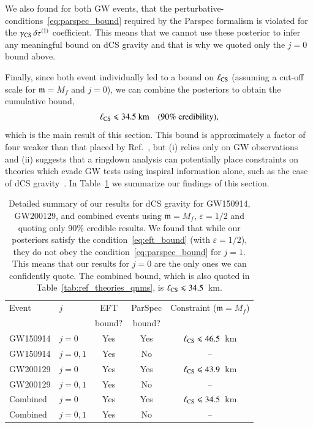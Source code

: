 \documentclass[twocolumn,prd,aps,superscriptaddress,preprintnumbers,tightenlines,showpacs,nofootinbib,amsfonts,amsmath,longbibliography]{revtex4-1}
\newcommand{\gm}{\mathfrak{m}}
\begin{document}
We also found for both GW events, that the
perturbative-conditions~\eqref{eq:parspec_bound} required by the {\sc Parspec}
formalism is violated for the $\gamma_{\rm CS} \, \delta \tau^{(1)}$ coefficient.
%
This means that we cannot use these posterior to infer any meaningful bound on dCS gravity
and that is why we quoted only the $j=0$ bound above.

Finally, since both event individually led to a bound on $\ell_{\rm CS}$
(assuming a cut-off scale for $\gm = M_{f}$ and $j = 0$), we can combine the
posteriors to obtain the cumulative bound,
%
\begin{equation}
\ell_{\rm CS} \leqslant 34.5~\textrm{km}
\quad \textrm{(90\% credibility)},
\end{equation}
%
which is the main result of this section.
%
This bound is approximately a factor of four weaker than that placed by
Ref.~\cite{Silva:2020acr}, but
%
(i) relies only on GW observations and
%
(ii) suggests that a ringdown analysis can potentially place constraints on
theories which evade GW tests using inspiral information alone, such as the
case of dCS gravity~\cite{Nair:2019iur,Perkins:2021mhb,Lyu:2022gdr}.
%
In Table~\ref{tab:summary_dcs} we summarize our findings of this section.

\begin{table}[h]
\begin{tabular}{l l c c c}
\hline
\hline
Event & $j$ & EFT    & ParSpec & Constraint ($\gm = M_{f}$) \\
      &     & bound? & bound?  &                            \\
\hline
GW150914 & $j = 0$    & Yes & Yes & $\ell_{\rm CS} \leqslant 46.5$~km \\
GW150914 & $j = 0, 1$ & Yes & No  & --                                 \\
GW200129 & $j = 0$    & Yes & Yes & $\ell_{\rm CS} \leqslant 43.9$~km \\
GW200129 & $j = 0, 1$ & Yes & No  & --                                 \\
Combined & $j = 0$    & Yes & Yes & \cellcolor{blue!10}$\ell_{\rm CS} \leqslant 34.5$~km \\
Combined & $j = 0, 1$ & Yes & No  & --                                 \\
\hline
\hline
\end{tabular}
\caption{Detailed summary of our results for dCS gravity for GW150914, GW200129, and
combined events using $\gm = M_{f}$, $\varepsilon = 1/2$ and quoting only 90\% credible results.
%
We found that while our posteriors satisfy the condition~\eqref{eq:eft_bound} (with $\varepsilon = 1/2$),
they do not obey the condition~\eqref{eq:parspec_bound} for $j = 1$. This means
that our results for $j=0$ are the only ones we can confidently quote.
%
The combined bound, which is also quoted in Table~\ref{tab:ref_theories_qnms},
is $\ell_{\rm CS} \leqslant 34.5$~km.
}
\label{tab:summary_dcs}
\end{table}
\end{document}
